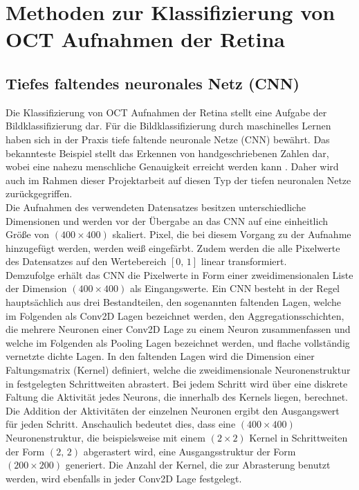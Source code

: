 \section{Methoden zur Klassifizierung von OCT Aufnahmen der Retina}
\subsection{Tiefes faltendes neuronales Netz (CNN)}
Die Klassifizierung von OCT Aufnahmen der Retina stellt eine Aufgabe der Bildklassifizierung dar. Für die Bildklassifizierung durch maschinelles Lernen haben sich in der Praxis tiefe faltende neuronale Netze (CNN) bewährt. Das bekannteste Beispiel stellt das Erkennen von handgeschriebenen Zahlen dar, wobei eine nahezu menschliche Genauigkeit erreicht werden kann \cite{MNIST}. Daher wird auch im Rahmen dieser Projektarbeit auf diesen Typ der tiefen neuronalen Netze zurückgegriffen. \\
Die Aufnahmen des verwendeten Datensatzes besitzen unterschiedliche Dimensionen und werden vor der Übergabe an das CNN auf eine einheitlich Größe von $(400\times 400)$ skaliert. Pixel, die bei diesem Vorgang zu der Aufnahme hinzugefügt werden, werden weiß eingefärbt. Zudem werden die alle Pixelwerte des Datensatzes auf den Wertebereich $[0,\,1]$ linear transformiert. \\ 
Demzufolge erhält das CNN die Pixelwerte in Form einer zweidimensionalen Liste der Dimension $(400\times 400)$ als Eingangswerte. Ein CNN besteht in der Regel hauptsächlich aus drei Bestandteilen, den sogenannten faltenden Lagen, welche im Folgenden als Conv2D Lagen bezeichnet werden, den Aggregationsschichten, die mehrere Neuronen einer Conv2D Lage zu einem Neuron zusammenfassen und welche im Folgenden als Pooling Lagen bezeichnet werden, und flache vollständig vernetzte dichte Lagen. In den faltenden Lagen wird die Dimension einer Faltungsmatrix (Kernel) definiert, welche die zweidimensionale Neuronenstruktur in festgelegten Schrittweiten abrastert. Bei jedem Schritt wird über eine diskrete Faltung die Aktivität jedes Neurons, die innerhalb des Kernels liegen, berechnet. Die Addition der Aktivitäten der einzelnen Neuronen ergibt den Ausgangswert für jeden Schritt. Anschaulich bedeutet dies, dass eine $(400\times 400)$ Neuronenstruktur, die beispielsweise mit einem $(2 \times 2)$ Kernel in Schrittweiten der Form $(2,\,2)$ abgerastert wird, eine Ausgangsstruktur der Form $(200\times 200)$ generiert. Die Anzahl der Kernel, die zur Abrasterung benutzt werden, wird ebenfalls in jeder Conv2D Lage festgelegt.  \\
